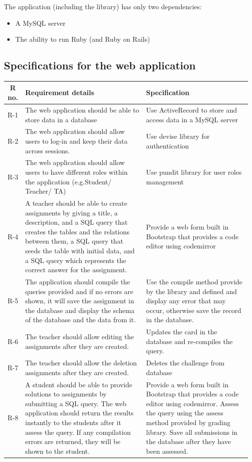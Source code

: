 The application (including the library) has only two dependencies:
\begin{itemize}
  \item A MySQL server
  \item The ability to run Ruby (and Ruby on Rails)
\end{itemize}

\subsection{Specifications for the web application}

\begin{tabularx}{\textwidth}{|c|Y|Y|}
  \hline
  \textbf{R no.} & \textbf{Requirement details} & \textbf{Specification} \\\hline
  \endhead
  R-1 & The web application should be able to store data in a database & Use ActiveRecord to store and access data in a MySQL server \\\hline
  R-2 & The web application should allow users to log-in and keep their data across sessions. & Use devise library for authentication \\\hline
  R-3 &  The web application should allow users to have different roles within the application (e.g.Student/ Teacher/ TA) & Use pundit library for user roles management \\\hline
  R-4 &  A teacher should be able to create assignments by giving a title, a description, and a SQL query that creates the tables and the relations between them, a SQL query that seeds the table with initial data, and a SQL query which represents the correct answer for the assignment. & Provide a web form built in Bootstrap that provides a code editor using codemirror \\\hline
  R-5 &  The application should compile the queries provided and if no errors are shown, it will save the assignment in the database and display the schema of the database and the data from it. & Use the compile method provide by the library and defined and display any error that may occur, otherwise save the record in the database. \\\hline
  R-6 & The teacher should allow editing the assignments after they are created. & Updates the card in the database and re-compiles the query. \\\hline
  R-7 & The teacher should allow the deletion assignments after they are created. & Deletes the challenge from database \\\hline
  R-8 & A student should be able to provide solutions to assignments by submitting a SQL query. The web application should return the results instantly to the students after it assess the query. If any compilation errors are returned, they will be shown to the student. & Provide a web form built in Bootstrap that provides a code editor using codemirror. Assess the query using the assess method provided by grading library. Save all submissions in the database after they have been assessed. \\\hline

\end{tabularx}
